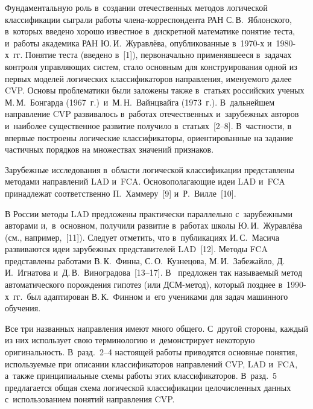 \begin{multicols}{2}
  Фундаментальную роль в~создании отечественных методов логической 
классификации сыгра\-ли работы чле\-на-кор\-рес\-пон\-ден\-та РАН С.\,В.~Яблонского, 
в~которых введено хорошо известное в~дискретной математике понятие тес\-та, 
и~работы академика РАН Ю.\,И.~Журавлёва, опубликованные в~1970-х и~1980-х~гг. Понятие тес\-та (введено в~[1]), первоначально 
при\-ме\-няв\-ше\-еся в~задачах конт\-ро\-ля управ\-ля\-ющих сис\-тем, стало основным для 
конструирования одной из первых моделей логических классификаторов 
на\-прав\-ле\-ния, име\-ну\-емо\-го далее CVP. Основы 
проб\-ле\-ма\-ти\-ки были заложены так\-же в~стать\-ях российских ученых 
М.\,М.~Бонгарда (1967~г.)\ и~М.\,Н.~Вайнцвайга (1973~г.). В~дальнейшем 
на\-прав\-ле\-ние CVP развивалось в~работах отечественных и~зарубежных авторов 
и~наиболее существенное развитие получило в~стать\-ях~[2--8]. В~част\-ности, 
в~\cite{6-duk, 7-duk} впер\-вые по\-стро\-ены логические классификаторы, 
ориентированные на задание час\-тич\-ных порядков на множествах значений 
при\-зна\-ков. 
  
  Зарубежные исследования в~об\-ласти логической классификации 
пред\-став\-ле\-ны методами на\-прав\-ле\-ний LAD и~FCA. Осно\-во\-по\-ла\-га\-ющие идеи LAD и~FCA принадлежат 
соответственно П.~Хам\-ме\-ру~[9] и~Р.~Вил\-ле~[10]. 
  
  В России методы LAD предложены практически параллельно с~зарубежными 
авторами и,~в~основ\-ном, получили развитие в~работах школы 
Ю.\,И.~Жу\-рав\-лё\-ва (см., например,~[11]). Следует отметить, что в~пуб\-ли\-ка\-ци\-ях 
И.\,С.~Масича развиваются идеи за\-ру\-беж\-ных пред\-ста\-ви\-те\-лей LAD~[12]. 
Методы FCA пред\-став\-ле\-ны работами В.\,К.~Фин\-на, С.\,О.~Куз\-не\-цо\-ва, 
М.\,И.~За\-бе\-жай\-ло, Д.\,И.~Иг\-на\-то\-ва и~Д.\,В.~Ви\-но\-гра\-до\-ва~[13--17].  
В~\cite{13-duk} предложен так на\-зы\-ва\-емый метод автоматического по\-рож\-де\-ния 
гипотез (или ДСМ-ме\-тод), который позднее в~1990-х~гг.\ был адап\-ти\-ро\-ван 
В.\,К.~Фин\-ном и~его учениками для задач машинного обуче\-ния. 
  
  Все три названных на\-прав\-ле\-ния имеют много общего. С~другой стороны, 
каж\-дый из них использует свою терминологию и~демонстрирует некоторую 
ори\-ги\-наль\-ность. В~разд.~2--4 на\-сто\-ящей работы приводятся основные понятия, 
ис\-поль\-зу\-емые при описании классификаторов на\-прав\-ле\-ний CVP, LAD и~FCA, 
а~так\-же принципиальные схемы работы этих классификаторов. В~разд.~5 
предлагается общая схема логической классификации це\-ло\-чис\-лен\-ных данных 
с~использованием понятий на\-прав\-ле\-ния CVP. 
  

\end{multicols}
